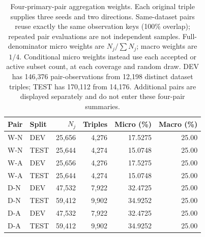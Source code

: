 \begin{table}[htbp]
\centering\footnotesize\setlength{\tabcolsep}{3pt}
\caption{Four-primary-pair aggregation weights. Each original triple supplies three seeds and two directions. Same-dataset pairs reuse exactly the same observation keys (100\% overlap); repeated pair evaluations are not independent samples. Full-denominator micro weights are $N_j/\sum N_j$; macro weights are $1/4$. Conditional micro weights instead use each accepted or active subset count, at each coverage and random draw. DEV has 146,376 pair-observations from 12,198 distinct dataset triples; TEST has 170,112 from 14,176. Additional pairs are displayed separately and do not enter these four-pair summaries.}
\label{tab:coverage-weights}
\begin{tabular}{llrrrr}
\toprule
Pair & Split & $N_j$ & Triples & Micro (\%) & Macro (\%)\\
\midrule
W-N & DEV & 25,656 & 4,276 & 17.5275 & 25.00\\
W-N & TEST & 25,644 & 4,274 & 15.0748 & 25.00\\
W-A & DEV & 25,656 & 4,276 & 17.5275 & 25.00\\
W-A & TEST & 25,644 & 4,274 & 15.0748 & 25.00\\
D-N & DEV & 47,532 & 7,922 & 32.4725 & 25.00\\
D-N & TEST & 59,412 & 9,902 & 34.9252 & 25.00\\
D-A & DEV & 47,532 & 7,922 & 32.4725 & 25.00\\
D-A & TEST & 59,412 & 9,902 & 34.9252 & 25.00\\
\bottomrule
\end{tabular}
\end{table}
